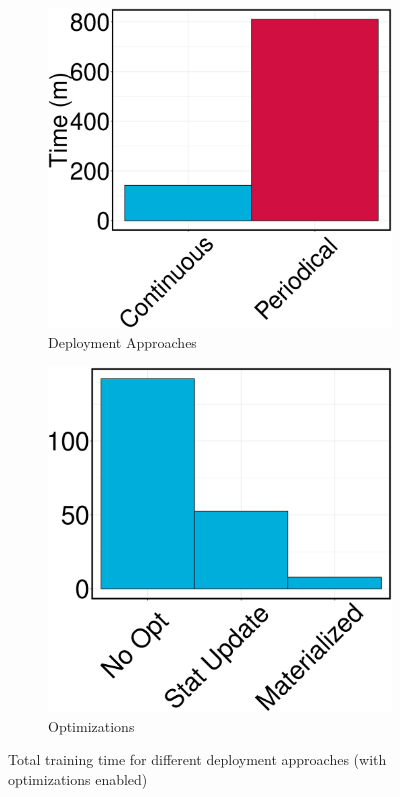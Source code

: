 \begin{figure}[h]
\begin{subfigure}{\columnwidth/2}
\centering
\includegraphics[width=\columnwidth]{../images/experiment-results/criteo-training-time-deployment-types-experiment.eps}
\caption{Deployment Approaches}
\label{fig:training-time-deployment}
\end{subfigure}%
\begin{subfigure}{\columnwidth/2}
\centering
\includegraphics[width=\columnwidth]{../images/experiment-results/criteo-training-time-optimizations-experiment.eps}
\caption{Optimizations}
\label{fig:training-time-optimization}
\end{subfigure}
\vspace{2mm}
\caption{Total training time for different deployment approaches (with optimizations enabled)}
\end{figure}

